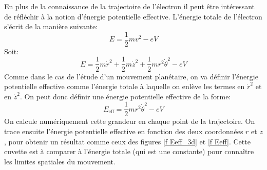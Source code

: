 \documentclass[a4paper,12pt]{article}
\begin{document}
En plus de la connaissance de la trajectoire de l'électron il peut être intéressant de réfléchir à la notion d'énergie potentielle effective. L'énergie totale de l'électron s'écrit de la manière suivante:
\[
E = \frac 1 2 mv^2 - eV
\]
Soit:
\[
E = \frac 1 2 m \dot{r}^2 + \frac 1 2 m \dot{z}^2 + \frac 1 2 m r^2 \dot{\theta}^2 - e V
\]
Comme dans le cas de l'étude d'un mouvement planétaire, on va définir l'énergie potentielle effective comme l'énergie totale à laquelle on enlève les termes en $\dot{r}^2$ et en $\dot{z}^2$. On peut donc définir une énergie potentielle effective de la forme:
\[
E_{\mathrm{eff}} = \frac 1 2 m r^2 \dot{\theta}^2 -e V
\]
On calcule numériquement cette grandeur en chaque point de la trajectoire. On trace ensuite l'énergie potentielle effective en fonction des deux coordonnées $r$ et $z$, pour obtenir un résultat comme ceux des figures \ref{f Eeff_3d} et \ref{f Eeff}. Cette cuvette est à comparer à l'énergie totale (qui est une constante) pour connaître les limites spatiales du mouvement.
\end{document}
